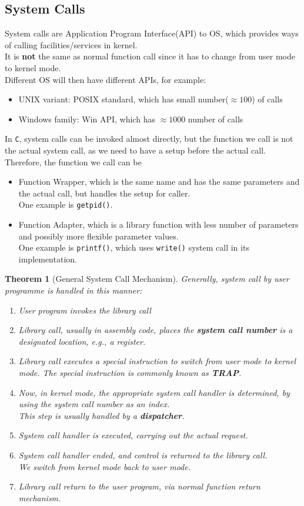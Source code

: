 \documentclass[11pt]{article}
\newtheorem{theorem}{Theorem}[section]
\theoremstyle{definition}
\begin{document}
\subsection{System Calls}
System calls are Application Program Interface(API) to OS, which provides ways of calling facilities/services in kernel.\\It is \textbf{not} the same as normal function call since it has to change from user mode to kernel mode.\\
Different OS will then have different APIs, for example:
\begin{itemize}[itemsep=0pt]
  \item UNIX variant: POSIX standard, which has small number($\approx 100$) of calls
  \item Windows family: Win API, which has $\approx 1000$ number of calls
\end{itemize}
In \texttt{C}, system calls can be invoked almost directly, but the function we call is not the actual system call, as we need to have a setup before the actual call. Therefore, the function we call can be
\begin{itemize}[itemsep=0pt]
  \item Function Wrapper, which is the same name and has the same parameters and the actual call, but handles the setup for caller. \\One example is \texttt{getpid()}.
  \item Function Adapter, which is a library function with less number of parameters and possibly more flexible parameter values.\\One example is \texttt{printf()}, which uses \texttt{write()} system call in its implementation.
\end{itemize}
\begin{theorem}[General System Call Mechanism]
\normalfont Generally, system call by user programme is handled in this manner:
\begin{enumerate}
  \item User program invokes the library call
  \item Library call, usually in assembly code, places the \textbf{system call number} is a designated location, e.g., a register.
  \item Library call executes a special instruction to switch from user mode to kernel mode. The special instruction is commonly known as \textbf{TRAP}. 
  \item Now, in kernel mode, the appropriate system call handler is determined, by using the system call number as an index. \\This step is usually handled by a \textbf{dispatcher}.
  \item System call handler is executed, carrying out the actual request.
  \item System call handler ended, and control is returned to the library call. \\We switch from kernel mode back to user mode.
  \item Library call return to the user program, via normal function return mechanism.
\end{enumerate}
\end{theorem}
\end{document}
